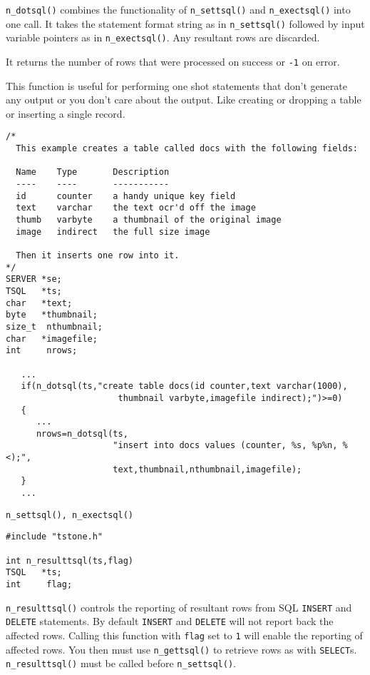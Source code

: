 \DESCRIPTION

\verb`n_dotsql()` combines the functionality of \verb`n_settsql()` and
\verb`n_exectsql()` into one call.  It takes the statement format string
as in \verb`n_settsql()` followed by input variable pointers as in
\verb`n_exectsql()`.  Any resultant rows are discarded.

It returns the number of rows that were processed on success or
\verb`-1` on error.

This function is useful for performing one shot statements that don't
generate any output or you don't care about the output.  Like creating
or dropping a table or inserting a single record.

\EXAMPLE
\begin{verbatim}
/*
  This example creates a table called docs with the following fields:

  Name    Type       Description
  ----    ----       -----------
  id      counter    a handy unique key field
  text    varchar    the text ocr'd off the image
  thumb   varbyte    a thumbnail of the original image
  image   indirect   the full size image

  Then it inserts one row into it.
*/
SERVER *se;
TSQL   *ts;
char   *text;
byte   *thumbnail;
size_t  nthumbnail;
char   *imagefile;
int     nrows;

   ...
   if(n_dotsql(ts,"create table docs(id counter,text varchar(1000),
                      thumbnail varbyte,imagefile indirect);")>=0)
   {
      ...
      nrows=n_dotsql(ts,
                     "insert into docs values (counter, %s, %p%n, %<);",
                     text,thumbnail,nthumbnail,imagefile);
   }
   ...
\end{verbatim}

\SEE
\begin{verbatim}
n_settsql(), n_exectsql()
\end{verbatim}


\SYNOPSIS
\begin{verbatim}
#include "tstone.h"

int n_resulttsql(ts,flag)
TSQL   *ts;
int     flag;
\end{verbatim}

\DESCRIPTION

\verb`n_resulttsql()` controls the reporting of resultant rows from SQL
\verb`INSERT` and \verb`DELETE` statements.  By default \verb`INSERT` and \verb`DELETE` will not
report back the affected rows.  Calling this function with \verb`flag`
set to \verb`1` will enable the reporting of affected rows.  You then
must use \verb`n_gettsql()` to retrieve rows as with \verb`SELECT`s.
\verb`n_resulttsql()` must be called before \verb`n_settsql()`.

